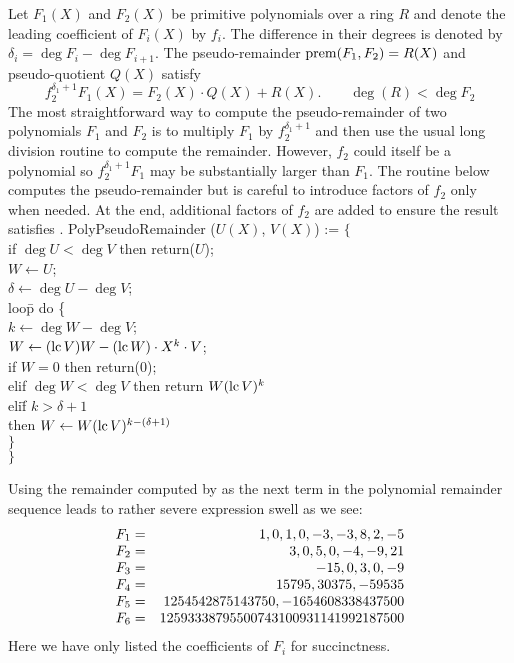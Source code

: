 Let $F_1(X)$ and $F_2(X)$ be primitive polynomials over a ring $R$ and
denote the leading coefficient of $F_i(X)$ by $f_i$.  The difference in
their degrees is denoted by $\delta_{i} = \deg F_{i} - \deg F_{i+1}$.  The
pseudo-remainder $\mathop{\rm prem}\nolimits(F_{1}, F_{2}) = R(X)$ and pseudo-quotient $Q(X)$
satisfy
\begin{equation}
f_2^{\delta_1+1} F_1(X) = F_2(X)\cdot Q(X) + R(X). \qquad \deg(R) < \deg F_2
\label{Pseudo:Remainder:Eq}
\end{equation}
The most straightforward way to compute the pseudo-remainder of two
polynomials $F_{1}$ and $F_{2}$ is to multiply $F_{1}$ by
$f_{2}^{\delta_{1}+1}$ and then use the usual long division routine to
compute the remainder.  However, $f_{2}$ could itself be a polynomial
so $f_{2}^{\delta_{1}+1} F_{1}$ may be substantially larger than
$F_{1}$.  The routine  below computes the
pseudo-remainder but is careful to introduce factors of $f_{2}$ only
when needed.  At the end, additional factors of $f_{2}$ are added to
ensure the result satisfies .
\begindsacode
PolyPseudoRemainder ($U(X)$, $V(X)$) := $\{$ \\
\> if $\deg U < \deg V$ then return($U$);\\
\> $W \leftarrow U$; \\
\> $\delta \leftarrow \deg U - \deg V$; \\
\> loo\=p do \{\\
\> \> $k \leftarrow \deg W - \deg V$; \\
\> \> $W \leftarrow (\operatorname{lc} V) W -  (\operatorname{lc} W)\cdot X^{k} \cdot V$; \\
\> \> if $W = 0$ then return($0$); \\
\> \> elif $\deg W < \deg V$ then return $W (\operatorname{lc} V)^{k}$ \\
\> \> eli\=f $k > \delta + 1$ \\
\> \> \> then $W \leftarrow W (\operatorname{lc} V)^{k - (\delta + 1)}$\\
\>\> $\}$\\
\> $\}$
\enddsacode

Using the remainder computed by  as the next
term in the polynomial remainder sequence leads to rather severe
expression swell as we see:
\begin{equation}
\begin{array}[15pt]{lr}
  F_1=&1, 0, 1, 0, -3, -3, 8, 2, -5\\
  F_2=&3, 0, 5, 0, -4, -9, 21\\
  F_3=&-15, 0, 3, 0, -9\\
  F_4=&15795, 30375, -59535\\
  F_5=& 1254542875143750, -1654608338437500\\
  F_6=& 12593338795500743100931141992187500
\end{array}
\label{Euclidean:PRS:Eq}
\end{equation}
Here we have only listed the coefficients of $F_i$ for succinctness.

